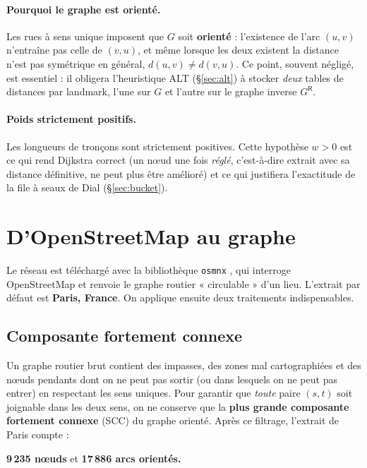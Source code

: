\paragraph{Pourquoi le graphe est orienté.}
Les rues à sens unique imposent que $G$ soit \textbf{orienté} : l'existence de
l'arc $(u, v)$ n'entraîne pas celle de $(v, u)$, et même lorsque les deux
existent la distance n'est pas symétrique en général,
$d(u, v) \neq d(v, u)$. Ce point, souvent négligé, est essentiel : il obligera
l'heuristique ALT (\S\ref{sec:alt}) à stocker \emph{deux} tables de distances par
landmark, l'une sur $G$ et l'autre sur le graphe inverse $G^{\mathsf{R}}$.

\paragraph{Poids strictement positifs.}
Les longueurs de tronçons sont strictement positives. Cette hypothèse
$w > 0$ est ce qui rend Dijkstra correct (un nœud une fois \emph{réglé}, c'est-à-dire
extrait avec sa distance définitive, ne peut plus être amélioré) et ce qui
justifiera l'exactitude de la file à seaux de Dial (\S\ref{sec:bucket}).

\section{D'OpenStreetMap au graphe}
\label{sec:osm}

Le réseau est téléchargé avec la bibliothèque \texttt{osmnx}
\citep{boeing2017osmnx}, qui interroge OpenStreetMap et renvoie le graphe
routier « circulable » d'un lieu. L'extrait par défaut est
\textbf{Paris, France}. On applique ensuite deux traitements indispensables.

\subsection{Composante fortement connexe}

Un graphe routier brut contient des impasses, des zones mal cartographiées et des
nœuds pendants dont on ne peut pas sortir (ou dans lesquels on ne peut pas
entrer) en respectant les sens uniques. Pour garantir que \emph{toute} paire
$(s, t)$ soit joignable dans les deux sens, on ne conserve que la
\textbf{plus grande composante fortement connexe} (SCC) du graphe orienté. Après
ce filtrage, l'extrait de Paris compte :

\begin{center}
\textbf{9\,235 nœuds} \quad et \quad \textbf{17\,886 arcs orientés.}
\end{center}

